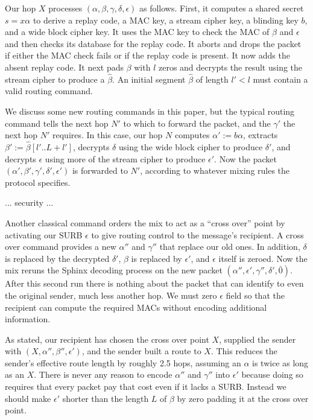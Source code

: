\documentclass[twoside,letterpaper]{llncs}
\begin{document}
Our hop $X$ processes $(\alpha,\beta,\gamma,\delta,\epsilon)$
as follows.  First, it computes a shared secret $s = x \alpha$ to
derive a replay code, a MAC key, a stream cipher key, 
 a blinding key $b$, and a wide block cipher key. 
It uses the MAC key to check the MAC of $\beta$ and $\epsilon$ and
 then checks its database for the replay code.
It aborts and drops the packet if either the MAC check fails or
 if the replay code is present.  It now adds the absent replay code.
It next pads $\beta$ with $l$ zeros and decrypts the result
 using the stream cipher to produce a $\hat\beta$.
An initial segment $\hat\beta$ of length $l' < l$ must contain
a valid routing command.  

We discuss some new routing commands in this paper, but the typical
routing command tells the next hop $N'$ to which to forward the
packet, and the $\gamma'$ the next hop $N'$ requires. 
In this case, our hop $N$ computes $\alpha' := b \alpha$,
extracts $\beta' := \hat\beta[l'..L+l']$,
decrypts $\delta$ using the wide block cipher
 to produce $\delta'$, and
decrypts $\epsilon$ using more of the stream cipher
 to produce $\epsilon'$.
Now the packet $(\alpha',\beta',\gamma',\delta',\epsilon')$ is
forwarded to $N'$,
 according to whatever mixing rules the protocol specifies.

... security ...

Another classical command orders the mix to act as a ``cross over''
point by activating our SURB $\epsilon$ to give routing control to
the message's recipient.  A cross over command provides a new
$\alpha''$ and $\gamma''$ that replace our old ones.  
In addition, $\delta$ is replaced by the decrypted $\delta'$, 
$\beta$ is replaced by $\epsilon'$, and $\epsilon$ itself is zeroed.
Now the mix reruns the Sphinx decoding process on the new packet
$(\alpha'',\epsilon',\gamma'',\delta',\bar{0})$.  
After this second run there is nothing about the packet that can
identify to even the original sender, much less another hop.
We must zero $\epsilon$ field so that the recipient can compute
the required MACs without encoding additional information. 

As stated, our recipient has chosen the cross over point $X$,
supplied the sender with $(X,\alpha'',\beta'',\epsilon')$,
and the sender built a route to $X$.  This reduces the sender's
effective route length by roughly 2.5 hops, assuming an $\alpha$
is twice as long as an $X$.  There is never any reason to encode
$\alpha''$ and $\gamma''$ into $\epsilon'$ because doing so
requires that every packet pay that cost even if it lacks a SURB.
Instead we should make $\epsilon'$ shorter than the length $L$ of
$\beta$ by zero padding it at the cross over point. 
\end{document}
